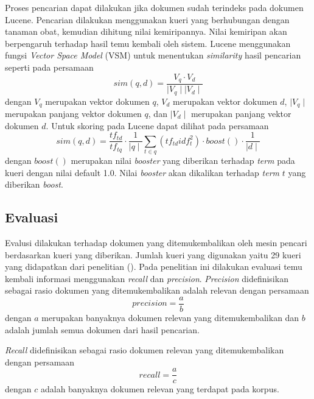 Proses pencarian dapat dilakukan jika dokumen sudah terindeks pada dokumen Lucene. Pencarian dilakukan menggunakan kueri yang berhubungan dengan tanaman obat, kemudian dihitung nilai kemiripannya. Nilai kemiripan akan berpengaruh terhadap hasil temu kembali oleh sistem. Lucene menggunakan fungsi \textit{Vector Space Model} (VSM) untuk menentukan \textit{similarity} hasil pencarian seperti pada persamaan 
\begin{equation}
sim(q,d)=\frac{V_q \cdot V_d}{\mid V_q\mid \mid V_d\mid}
\label{eq:similarity}
\end{equation}
\noindent dengan $V_q$ merupakan vektor dokumen $q$, $V_d$ merupakan vektor dokumen $d$, $\mid V_q\mid$ merupakan panjang vektor dokumen $q$, dan $\mid V_d\mid$ merupakan panjang vektor dokumen $d$. Untuk skoring pada Lucene dapat dilihat pada persamaan 
\begin{equation}
sim(q,d)=\frac{tf_{td}}{tf_{tq}} \cdot \frac{1}{\mid q\mid}
\sum_{t \in q} (tf_{td} idf_t^2) \cdot boost() \cdot \frac{1}{\mid d\mid}
\label{eq:simlucene}
\end{equation}
\noindent dengan $boost()$ merupakan nilai \textit{booster} yang diberikan terhadap \textit{term} pada kueri dengan nilai default 1.0. Nilai \textit{booster} akan dikalikan terhadap \textit{term} $t$ yang diberikan \textit{boost}.

\subsection*{Evaluasi}
Evalusi dilakukan terhadap dokumen yang ditemukembalikan oleh mesin pencari berdasarkan kueri yang diberikan. Jumlah kueri yang digunakan yaitu 29 kueri yang didapatkan dari penelitian \citeauthor{HERAWAN} (\cite*{HERAWAN}). Pada penelitian ini dilakukan evaluasi temu kembali informasi menggunakan \textit{recall} dan \textit{precision}. \textit{Precision} didefinisikan sebagai rasio dokumen yang ditemukembalikan adalah relevan dengan persamaan
\begin{equation}
precision=\frac{a}{b}
\label{eq:precision}
\end{equation}
\noindent dengan $a$ merupakan banyaknya dokumen relevan yang ditemukembalikan dan $b$ adalah jumlah semua dokumen dari hasil pencarian. 

\textit{Recall} didefinisikan sebagai rasio dokumen relevan yang ditemukembalikan dengan persamaan
\begin{equation}
recall=\frac{a}{c}
\label{eq:recall}
\end{equation}
\noindent dengan $c$ adalah banyaknya dokumen relevan yang terdapat pada korpus.

